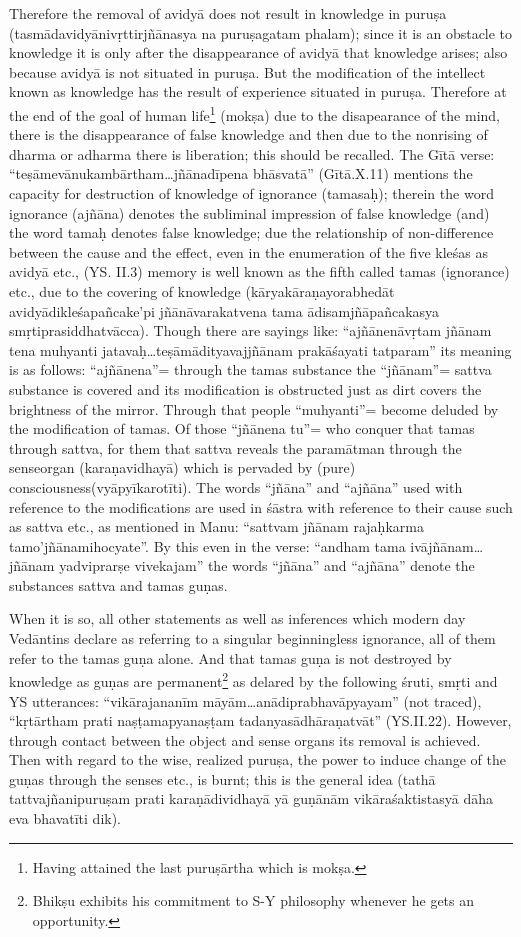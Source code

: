 Therefore the removal of avidyā does not result in knowledge in puruṣa  (tasmādavidyānivṛttirjñānasya na puruṣagatam phalam); since it is an obstacle to knowledge it is only after the disappearance of avidyā that knowledge arises; also because avidyā is not situated in puruṣa.  But the modification of the intellect known as knowledge has the result of experience situated in puruṣa. Therefore at the end of the goal of human life\footnote{Having attained the last puruṣārtha which is mokṣa.} (mokṣa) due to the disapearance of the mind, there is the disappearance of false knowledge and then due to the nonrising of dharma or adharma there is liberation; this should be recalled. The Gītā verse: “teṣāmevānukambārtham…jñānadīpena bhāsvatā” (Gītā.\-X.11) mentions the capacity for destruction of knowledge of ignorance (tamasaḥ); therein the word ignorance (ajñāna) denotes the subliminal impression of false knowledge (and) the word tamaḥ denotes false knowledge; due the relationship of non-difference between the cause and the effect, even in the enumeration of the five kleśas as avidyā etc., (YS. II.3) memory is well known as the fifth called tamas (ignorance) etc., due to the covering of knowledge   (kāryakāraṇayorabhedāt avidyādikleśapañcake’pi jñānāvarakatvena tama ādisamjñāpañcakasya smṛtiprasiddhatvācca). Though there are sayings like: “ajñānenāvṛtam jñānam tena muhyanti jatavaḥ…teṣāmādityavajjñānam prakāśayati tatparam” its meaning is as follows: “ajñānena”= through the tamas substance the “jñānam”= sattva substance is covered and its modification is obstructed just as dirt covers the brightness of the mirror.  Through that people “muhyanti”= become deluded by the modification of tamas. Of those “jñānena tu”= who conquer that tamas through sattva, for them that sattva reveals the paramātman through the sense\break organ (karaṇavidhayā) which is pervaded by (pure) consciousness\break (vyāpyīkarotīti). The words “jñāna” and “ajñāna” used with reference to the modifications are used in śāstra with reference to their cause such as sattva etc., as mentioned in Manu: “sattvam jñānam rajaḥ\break karma tamo’jñānamihocyate”. By this even in the verse: “andham tama ivājñānam…jñānam yadviprarṣe vivekajam” the words “jñāna” and “ajñāna” denote the substances sattva and tamas guṇas. 

When it is so, all other statements as well as inferences which modern day Vedāntins declare as referring to a singular beginningless ignorance, all of them refer to the tamas guṇa alone. And that tamas guṇa is not destroyed by knowledge as guṇas are permanent\footnote{Bhikṣu exhibits his commitment to S-Y philosophy whenever he gets an opportunity.} as delared by the following śruti, smṛti and YS utterances: “vikārajananīm māyām…anādiprabhavāpyayam” (not traced), “kṛtārtham prati naṣṭamapyanaṣṭam tadanyasādhāraṇatvāt” (YS.II.22). However, through contact between the object and sense organs its removal is achieved. Then with regard to the wise, realized puruṣa, the power to induce change of the guṇas through the senses etc., is burnt; this is the general idea (tathā tattvajñanipuruṣam prati karaṇādividhayā yā guṇānām vikāraśaktistasyā dāha eva bhavatīti dik).

